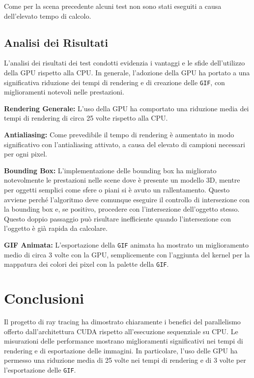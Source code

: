 \documentclass{article}
\begin{document}
Come per la scena precedente alcuni test non sono stati eseguiti a causa dell'elevato tempo di calcolo.


\subsection{Analisi dei Risultati}

L'analisi dei risultati dei test condotti evidenzia i vantaggi e le sfide dell'utilizzo della GPU rispetto alla CPU. In generale, l'adozione della GPU ha portato a una significativa riduzione dei tempi di rendering e di creazione delle \texttt{GIF}, con miglioramenti notevoli nelle prestazioni.

\textbf{Rendering Generale:} L'uso della GPU ha comportato una riduzione media dei tempi di rendering di circa 25 volte rispetto alla CPU.

\textbf{Antialiasing:} Come prevedibile il tempo di rendering è aumentato in modo significativo con l'antialiasing attivato, a causa del elevato di campioni necessari per ogni pixel.

\textbf{Bounding Box:} L'implementazione delle bounding box ha migliorato notevolmente le prestazioni nelle scene dove è presente un modello 3D, mentre per oggetti semplici come sfere o piani si è avuto un rallentamento. Questo avviene perché l'algoritmo deve comunque eseguire il controllo di intersezione con la bounding box e, se positivo, procedere con l'intersezione dell'oggetto stesso. Questo doppio passaggio può risultare inefficiente quando l'intersezione con l'oggetto è già rapida da calcolare.

\textbf{GIF Animata:} L'esportazione della \texttt{GIF} animata ha mostrato un miglioramento medio di circa 3 volte con la GPU, semplicemente con l'aggiunta del kernel per la mappatura dei colori dei pixel con la palette della \texttt{GIF}.

\section{Conclusioni}

Il progetto di ray tracing ha dimostrato chiaramente i benefici del parallelismo offerto dall'architettura CUDA rispetto all'esecuzione sequenziale su CPU. Le misurazioni delle performance mostrano miglioramenti significativi nei tempi di rendering e di esportazione delle immagini. In particolare, l'uso delle GPU ha permesso una riduzione media di 25 volte nei tempi di rendering e di 3 volte per l'esportazione delle \texttt{GIF}.



\end{document}
